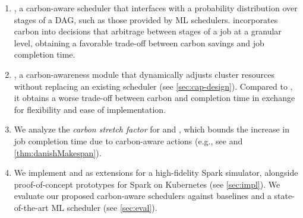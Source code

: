 \begin{enumerate}[itemsep=0.1cm]
    \item \PCAPS, 
    a carbon-aware scheduler that interfaces with a probability distribution over stages of a DAG, such as those provided by ML schedulers.  \PCAPS incorporates carbon into decisions that arbitrage between stages of a job at a granular level, obtaining a favorable trade-off between carbon savings and job completion time.
    \item \CAP, %
    a carbon-awareness module that dynamically adjusts cluster resources without replacing an existing scheduler (see \autoref{sec:cap-design}).  Compared to \PCAPS, it obtains a worse trade-off between carbon and completion time in exchange for flexibility and ease of implementation.
    \item  We analyze the \textit{carbon stretch factor} for \PCAPS and \CAP, which bounds the increase in job completion time due to carbon-aware actions (e.g., see  and \ref{thm:danishMakespan}).
    \item  We implement \PCAPS and \CAP as extensions for a high-fidelity Spark simulator, alongside proof-of-concept prototypes for Spark on Kubernetes (see \autoref{sec:impl}).  We evaluate our proposed carbon-aware schedulers against baselines and a state-of-the-art ML scheduler (see \autoref{sec:eval}). 
\end{enumerate}


